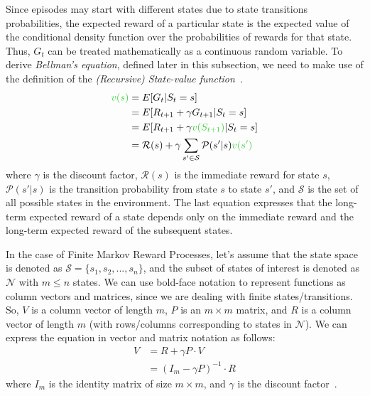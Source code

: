 \documentclass[../xlapes02]{subfiles}
\begin{document}
    Since episodes may start with different states due to state transitions probabilities, the expected reward of a particular state is the expected value of the conditional density function over the probabilities of rewards for that state. Thus, $G_t$ can be treated mathematically as a continuous random variable.
    To derive \emph{Bellman's equation}, defined later in this subsection, we need to make use of the definition of the \emph{(Recursive) State-value function}~\cite{FITMT25127, rao2022foundations}.
    \begin{equation}
        \begin{split}
            \textcolor[RGB]{51, 204, 51}{v(s)} &= E[G_t | S_t = s] \\
            &= E[R_{t+1} + \gamma G_{t+1} | S_t = s] \\
            &= E[R_{t+1} + \gamma \textcolor[RGB]{51, 204, 51}{v(S_{t+1})} | S_t = s]\\
            &= \mathcal{R}(s) + \gamma \sum_{s' \in \mathcal{S}} \mathcal{P}(s' | s) \textcolor[RGB]{51, 204, 51}{v(s')}
        \end{split}
    \end{equation}
    where $\gamma$ is the discount factor, $\mathcal{R}(s)$ is the immediate reward for state $s$, $\mathcal{P}(s' | s)$ is the transition probability from state $s$ to state $s'$, and $\mathcal{S}$ is the set of all possible states in the environment. The last equation expresses that the long-term expected reward of a state depends only on the immediate reward and the long-term expected reward of the subsequent states.

    In the case of Finite Markov Reward Processes, let's assume that the state space is denoted as $\mathcal{S} = \{s_1, s_2, ..., s_n\}$, and the subset of states of interest is denoted as $\mathcal{N}$ with $m \leq n$ states. We can use bold-face notation to represent functions as column vectors and matrices, since we are dealing with finite states/transitions. So, $V$ is a column vector of length $m$, $P$ is an $m \times m$ matrix, and $R$ is a column vector of length $m$ (with rows/columns corresponding to states in $\mathcal{N}$). We can express the equation in vector and matrix notation as follows:
    \begin{equation}
        \begin{split}
            V &= R + \gamma P \cdot V \\
            &= (I_m - \gamma P)^{-1} \cdot R
        \end{split}
    \end{equation}
    where $I_m$ is the identity matrix of size $m \times m$, and $\gamma$ is the discount factor~\cite{rao2022foundations}.
\end{document}

